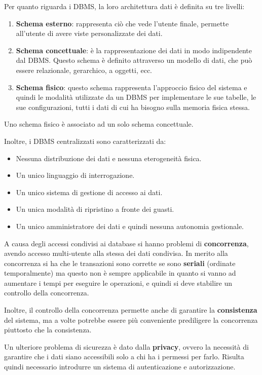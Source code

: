 Per quanto riguarda i DBMS, la loro architettura dati è definita su tre livelli:
\begin{enumerate}
      \item \textbf{Schema esterno}: rappresenta ciò che vede l'utente finale,
            permette all'utente di avere viste personalizzate dei dati.
      \item \textbf{Schema concettuale}: è la rappresentazione dei dati in modo
            indipendente dal DBMS. Questo schema è definito attraverso un modello
            di dati, che può essere relazionale, gerarchico, a oggetti, ecc.
      \item \textbf{Schema fisico}: questo schema rappresenta l'approccio fisico
            del sistema e quindi le modalità utilizzate da un DBMS per implementare
            le sue tabelle, le sue configurazioni, tutti i dati di cui ha bisogno
            sulla memoria fisica stessa.
\end{enumerate}
\begin{nota}
      Uno schema fisico è associato ad un solo schema concettuale.
\end{nota}
Inoltre, i DBMS centralizzati sono caratterizzati da:
\begin{itemize}
      \item Nessuna distribuzione dei dati e nessuna eterogeneità fisica.
      \item Un unico linguaggio di interrogazione.
      \item Un unico sistema di gestione di accesso ai dati.
      \item Un unica modalità di ripristino a fronte dei guasti.
      \item Un unico amministratore dei dati e quindi nessuna autonomia gestionale.
\end{itemize}
A causa degli accessi condivisi ai database si hanno problemi di \textbf{concorrenza},
avendo accesso multi-utente alla stessa dei dati condivisa. In merito alla
concorrenza si ha che le transazioni sono corrette se sono \textbf{seriali}
(ordinate temporalmente) ma questo non è sempre applicabile in quanto si vanno
ad aumentare i tempi per eseguire le operazioni, e quindi si deve stabilire un
controllo della concorrenza.

Inoltre, il controllo della concorrenza permette anche di garantire la
\textbf{consistenza} del sistema, ma a volte potrebbe essere più conveniente
prediligere la concorrenza piuttosto che la consistenza.

Un ulteriore problema di sicurezza è dato dalla \textbf{privacy}, ovvero la
necessità di garantire che i dati siano accessibili solo a chi ha i permessi
per farlo. Risulta quindi necessario introdurre un sistema di autenticazione
e autorizzazione.

